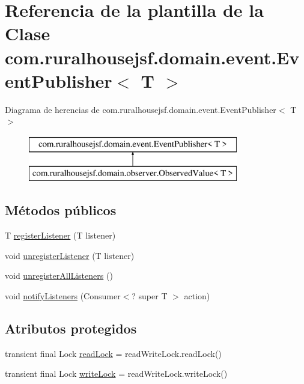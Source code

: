 \hypertarget{classcom_1_1ruralhousejsf_1_1domain_1_1event_1_1_event_publisher}{}\section{Referencia de la plantilla de la Clase com.\+ruralhousejsf.\+domain.\+event.\+Event\+Publisher$<$ T $>$}
\label{classcom_1_1ruralhousejsf_1_1domain_1_1event_1_1_event_publisher}
Diagrama de herencias de com.\+ruralhousejsf.\+domain.\+event.\+Event\+Publisher$<$ T $>$\begin{figure}[H]
\begin{center}
\leavevmode
\includegraphics[height=2.000000cm]{classcom_1_1ruralhousejsf_1_1domain_1_1event_1_1_event_publisher}
\end{center}
\end{figure}
\subsection*{Métodos públicos}
\begin{DoxyCompactItemize}
\item 
T \mbox{\hyperlink{classcom_1_1ruralhousejsf_1_1domain_1_1event_1_1_event_publisher_a65329dd472a54e80c4f024ae2d30f5c2}{register\+Listener}} (T listener)
\item 
void \mbox{\hyperlink{classcom_1_1ruralhousejsf_1_1domain_1_1event_1_1_event_publisher_a148baf3f922934d82a7042f70959b516}{unregister\+Listener}} (T listener)
\item 
void \mbox{\hyperlink{classcom_1_1ruralhousejsf_1_1domain_1_1event_1_1_event_publisher_aba48051da7096e2451b0a4f2d92eef40}{unregister\+All\+Listeners}} ()
\item 
void \mbox{\hyperlink{classcom_1_1ruralhousejsf_1_1domain_1_1event_1_1_event_publisher_a7bd776be1bff02b358cfae8b22f33b73}{notify\+Listeners}} (Consumer$<$? super T $>$ action)
\end{DoxyCompactItemize}
\subsection*{Atributos protegidos}
\begin{DoxyCompactItemize}
\item 
transient final Lock \mbox{\hyperlink{classcom_1_1ruralhousejsf_1_1domain_1_1event_1_1_event_publisher_a5ffe504fad62f049d51a80fb912b97f5}{read\+Lock}} = read\+Write\+Lock.\+read\+Lock()
\item 
transient final Lock \mbox{\hyperlink{classcom_1_1ruralhousejsf_1_1domain_1_1event_1_1_event_publisher_a1ed2aa95b3bceee1d543a0d0d7297171}{write\+Lock}} = read\+Write\+Lock.\+write\+Lock()
\end{DoxyCompactItemize}


